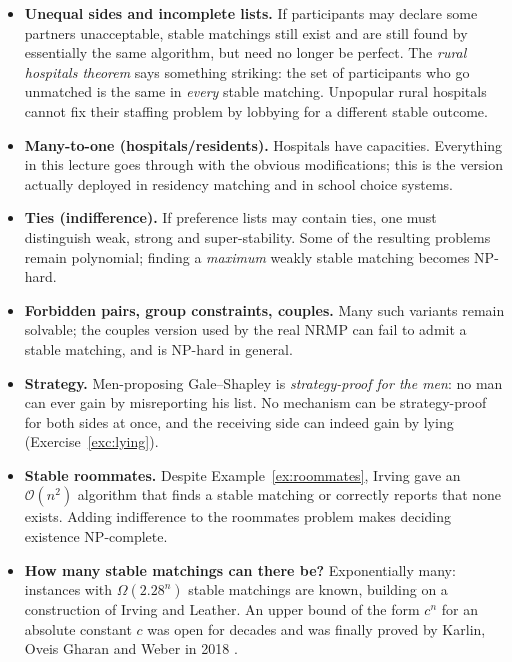 \documentclass[11pt,a4paper]{article}
\theoremstyle{plain}
\theoremstyle{definition}
\theoremstyle{remark}
\newcommand{\bigoh}[1]{\mathcal{O}\!\left(#1\right)}
\begin{document}
\begin{itemize}
  \item \textbf{Unequal sides and incomplete lists.} If participants may
        declare some partners unacceptable, stable matchings still exist and
        are still found by essentially the same algorithm, but need no longer
        be perfect. The \emph{rural hospitals theorem} says something striking:
        the set of participants who go unmatched is the same in \emph{every}
        stable matching. Unpopular rural hospitals cannot fix their staffing
        problem by lobbying for a different stable outcome.
  \item \textbf{Many-to-one (hospitals/residents).} Hospitals have capacities.
        Everything in this lecture goes through with the obvious modifications;
        this is the version actually deployed in residency matching and in
        school choice systems.
  \item \textbf{Ties (indifference).} If preference lists may contain ties, one
        must distinguish weak, strong and super-stability. Some of the
        resulting problems remain polynomial; finding a \emph{maximum} weakly
        stable matching becomes NP-hard.
  \item \textbf{Forbidden pairs, group constraints, couples.} Many such
        variants remain solvable; the couples version used by the real NRMP
        can fail to admit a stable matching, and is NP-hard in general.
  \item \textbf{Strategy.} Men-proposing Gale--Shapley is
        \emph{strategy-proof for the men}: no man can ever gain by
        misreporting his list. No mechanism can be strategy-proof for both
        sides at once, and the receiving side can indeed gain by lying
        (Exercise~\ref{exc:lying}).
  \item \textbf{Stable roommates.} Despite Example~\ref{ex:roommates}, Irving
        gave an $\bigoh{n^2}$ algorithm that finds a stable matching or
        correctly reports that none exists. Adding indifference to the
        roommates problem makes deciding existence NP-complete.
  \item \textbf{How many stable matchings can there be?} Exponentially many:
        instances with $\Omega(2.28^n)$ stable matchings are known, building on
        a construction of Irving and Leather. An upper bound of the form $c^n$
        for an absolute constant $c$ was open for decades and was finally
        proved by Karlin, Oveis Gharan and Weber in 2018
        \cite{KarlinOveisGharanWeber2018}.
\end{itemize}
\end{document}
